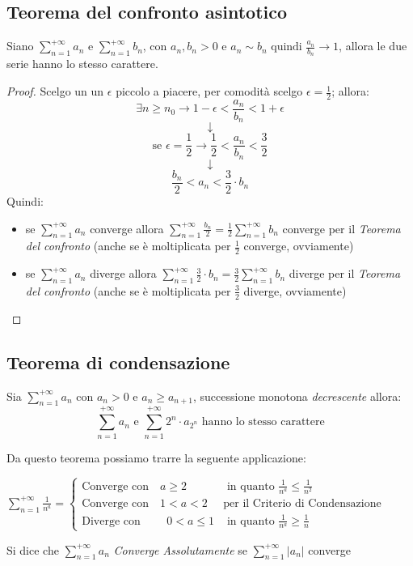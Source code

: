 \documentclass[a4paper,12pt, oneside]{book}
\begin{document}
\subsection{Teorema del confronto asintotico}
\begin{teorema} Siano $\sum_{n=1}^{+\infty} a_n$ e
  $\sum_{n=1}^{+\infty} b_n$, con $a_n,b_n>0$ e $a_n\sim b_n \mbox{ quindi }
  \frac{a_n}{b_n}\rightarrow 1$, allora le due serie hanno lo stesso carattere.
\end{teorema}
\begin{proof} Scelgo un un $\epsilon$ piccolo a piacere, per comodità scelgo
  $\epsilon=\frac{1}{2}$; allora:
  $$\exists n\geq n_0\longrightarrow 1-\epsilon<\frac{a_n}{b_n}<1+\epsilon$$
  $$\downarrow$$
  $$\mbox{se  } \epsilon=\frac{1}{2}\longrightarrow \frac{1}{2}<\frac{a_n}{b_n}<\frac{3}{2}$$
  $$\downarrow$$
  $$\frac{b_n}{2}<a_n<\frac{3}{2}\cdot b_n$$
  Quindi:
  \begin{itemize}
    \item se $\sum_{n=1}^{+\infty} a_n$ converge allora $\sum_{n=1}^{+\infty}
    \frac{b_n}{2} = \frac{1}{2}\sum_{n=1}^{+\infty} b_n$ converge per il
    \textit{Teorema del confronto} (anche se è moltiplicata per $\frac{1}{2}$
    converge, ovviamente)
    \item se $\sum_{n=1}^{+\infty} a_n$ diverge allora $\sum_{n=1}^{+\infty}
    \frac{3}{2}\cdot b_n = \frac{3}{2}\sum_{n=1}^{+\infty} b_n$ diverge per il
    \textit{Teorema del confronto} (anche se è moltiplicata per $\frac{3}{2}$
    diverge, ovviamente)
  \end{itemize}
\end{proof}
\subsection{Teorema di condensazione}
\begin{teorema} Sia $\sum_{n=1}^{+\infty} a_n$ con
  $a_n>0$ e $a_n\geq a_{n+1}$, successione monotona \textit{decrescente} allora:
  $$\sum_{n=1}^{+\infty} a_n \mbox{  e  } \sum_{n=1}^{+\infty} 2^n\cdot a_{2^n} \mbox{  hanno lo stesso carattere}$$
\end{teorema} Da questo teorema possiamo trarre la seguente applicazione:
\begin{center} $\sum_{n=1}^{+\infty} \frac{1}{n^a}=\left\{
    \begin{array}{ll} \mbox{Converge con } \mbox{ } a\geq 2 & \mbox{ in quanto
                                                              }\frac{1}{n^a}\leq \frac{1}{n^2} \\ \mbox{Converge con } \mbox{ } 1<a<2 & \mbox{
                                                                                                                                        per il Criterio di Condensazione} \\ \mbox{Diverge con } \mbox{ } \mbox{ }
      \mbox{ } 0<a\leq 1 & \mbox{ in quanto }\frac{1}{n^a}\geq \frac{1}{n}
    \end{array} \right.$
\end{center} Si dice che $\sum_{n=1}^{+\infty} a_n$ \textit{Converge
  Assolutamente} se $\sum_{n=1}^{+\infty} |a_n|$ converge
\end{document}
